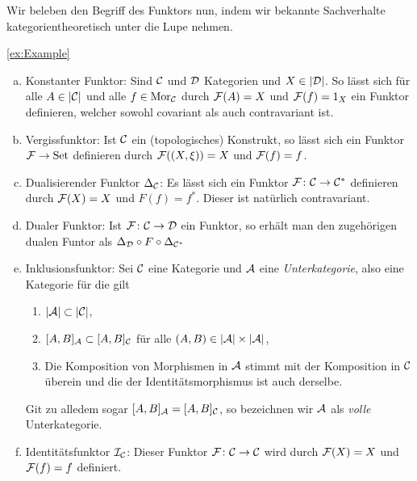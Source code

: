 Wir beleben den Begriff des Funktors nun, indem wir bekannte Sachverhalte kategorientheoretisch unter die Lupe nehmen.

\begin{ex}
  \ref{ex:Example}
\begin{enumerate}[a)]
    \item Konstanter Funktor: Sind $\mathcal{C}$ und $\mathcal{D}$ Kategorien und $X \in |\mathcal{D}|$.
      So lässt sich für alle $A \in |\mathcal{C}|$ und alle $f \in \mathrm{Mor}_{\mathcal{C}}$ durch $\mathcal{F}(A) = X$ und $\mathcal{F}(f) = 1_X$ ein Funktor definieren, welcher sowohl covariant als auch contravariant ist.
    \item Vergissfunktor: Ist $\mathcal{C}$ ein (topologisches) Konstrukt, so lässt sich ein Funktor $\mathcal{F} \to \mathrm{Set}$ definieren durch $\mathcal{F}((X, \xi)) = X$ und $\mathcal{F}(f) = f$.
    \item Dualisierender Funktor $\Delta_{\mathcal{C}}$: Es lässt sich ein Funktor $\mathcal{F} \colon \mathcal{C} \to \mathcal{C}^*$ definieren durch $\mathcal{F}(X) = X$ und $F(f) = f^*$. Dieser ist natürlich contravariant.
    \item Dualer Funktor: Ist $\mathcal{F} \colon \mathcal{C} \to \mathcal{D}$ ein Funktor, so erhält man den zugehörigen dualen Funtor als $\Delta_{\mathcal{D}} \circ F \circ \Delta_{\mathcal{C}^*}$
    \item Inklusionsfunktor: Sei $\mathcal{C}$ eine Kategorie und $\mathcal{A}$ eine \emph{Unterkategorie}, also eine Kategorie für die gilt
      \begin{enumerate}
        \item $|\mathcal{A}| \subset |\mathcal{C}|$,
        \item $[A, B]_{\mathcal{A}} \subset [A,B]_{\mathcal{C}}$ für alle $(A, B) \in |\mathcal{A}| \times |\mathcal{A}|$,
        \item Die Komposition von Morphismen in $\mathcal{A}$ stimmt mit der Komposition in $\mathcal{C}$ überein und die der Identitätsmorphismus ist auch derselbe.
      \end{enumerate}
      Git zu alledem sogar $[A, B]_{\mathcal{A}} = [A, B]_{\mathcal{C}}$, so bezeichnen wir $\mathcal{A}$ als \emph{volle} Unterkategorie.
    \item Identitätsfunktor $\mathcal{I}_{\mathcal{C}}$: Dieser Funktor $\mathcal{F} \colon \mathcal{C} \to \mathcal{C}$ wird durch $\mathcal{F}(X) = X$ und $\mathcal{F}(f) = f$ definiert.
  \end{enumerate}
\end{ex}

